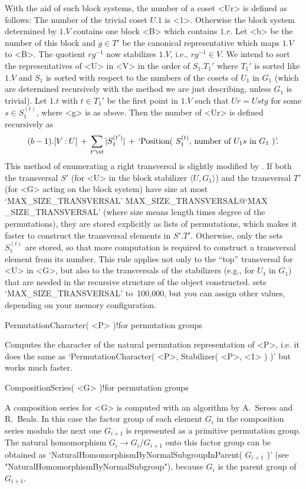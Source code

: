 With the aid of such block systems, the number of a coset <Ur> is defined
as follows:  The number of the trivial  coset $U.1$ is <1>. Otherwise the
block system  determined by $1.V$ contains one  block <B>  which contains
$1.r$. Let <b> be the number of this block and $g\in T'$ be the canonical
representative which maps  $1.V$   to <B>.  The  quotient  $rg^{-1}$  now
stabilizes  $1.V$,  i.e.,  $rg^{-1}\in   V$.  We   intend   to  sort  the
representatives of <U> in <V> in the order  of $S_1.T_1'$ where $T_1'$ is
sorted like $1.V$ and $S_1$ is sorted with respect to  the numbers of the
cosets of $U_1$  in $G_1$   (which are  determined  recursively with  the
method we are just  describing, unless $G_1$  is trivial). Let $1.t$ with
$t\in T_1'$ be  the  first point in  $1.V$  such that $Ur=Ustg$ for  some
$s\in S_1^{(t)}$,   where <g> is  as above.  Then  the number of  <Ur> is
defined recursively as
$$ (b-1).[V\mathbin:U]\, + \, \sum_{t'\<t}|S_1^{(t')}|\, + \,
   \hbox{`Position(  $S_1^{(t)}$, number of  $U_1s$ in $G_1$ )'.} $$
This  method of enumerating a  right transversal is  slightly modified by
{\GAP}. If both the  transversal  $S'$ (for <U>  in the  block stabilizer
$\langle  U,G_1\rangle$) and the transversal $T'$  (for <G> acting on the
block   system)  have    size   at  most   `MAX_SIZE_TRANSVERSAL'\atindex
{MAX\noexpand   _SIZE\noexpand  _TRANSVERSAL}{@\noexpand    `MAX\noexpand
_SIZE\noexpand _TRANSVERSAL'}  (where size  means length times  degree of
the  permutations), they are stored explicitly  as lists of permutations,
which makes it faster to  construct the transversal elements in  $S'.T'$.
Otherwise, only the sets $S_1^{(t)}$ are stored, so that more computation
is required to construct a transversal element from its number. This rule
applies not only  to the ``top'' transversal for  <U> in <G>, but also to
the transversals  of the stabilizers (e.g., for  $U_1$ in $G_1$) that are
needed in the recursive structure  of the object constructed. {\GAP} sets
`MAX_SIZE_TRANSVERSAL'  to~100{,}000,  but you  can  assign other values,
depending on your memory configuration.

\>PermutationCharacter( <P> )!{for permutation groups}

Computes the character of the  natural permutation representation of <P>,
i.e. it does the same as `PermutationCharacter( <P>, Stabilizer( <P>, <1>
) )' but works much faster.

\>CompositionSeries( <G> )!{for permutation groups}

A composition  series for <G> is  computed with an algorithm by A.~Seress
and R.~Beals. In this case the factor group of each  element $G_i$ in the
composition  series modulo the next   one $G_{i+1}$  is represented as  a
primitive    permutation group.   The  natural   homomorphism   $G_i  \to
G_i/G_{i+1}$   onto   this   factor    group   can   be    obtained    as
`NaturalHomomorphismByNormalSubgroupInParent(   $G_{i+1}$    )'      (see
"NaturalHomomorphismByNormalSubgroup"), because $G_i$ is the parent group
of~$G_{i+1}$.

